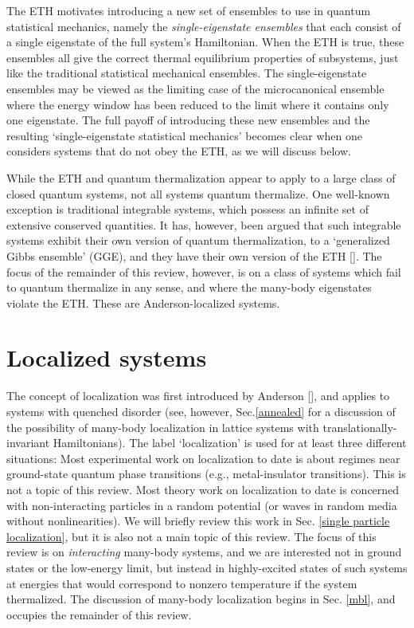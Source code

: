 \documentclass[amsmath,onecolumn, superscriptaddress,preprint,aps]{revtex4}
\renewcommand{\cite}[1]{[\onlinecite{#1}]}
\begin{document}
The ETH motivates introducing a new set of ensembles to use in quantum statistical mechanics, namely the {\it single-eigenstate ensembles} that each consist of a single eigenstate of the full system's Hamiltonian.  When the ETH is true, these ensembles all give the correct thermal equilibrium properties of subsystems, just like the traditional statistical mechanical ensembles.  The single-eigenstate ensembles may be viewed as the limiting case of the microcanonical ensemble where the energy window has been reduced to the limit where it contains only one eigenstate.  The full payoff of introducing these new ensembles and the resulting `single-eigenstate statistical mechanics' becomes clear when one considers systems that do not obey the ETH, as we will discuss below.

While the ETH and quantum thermalization appear to apply to a large class of closed quantum systems, not all systems quantum thermalize.  One well-known exception is traditional integrable systems, which possess an infinite set of extensive conserved quantities.  It has, however, been argued that such integrable systems exhibit their own version of quantum thermalization, to a `generalized Gibbs ensemble' (GGE), and they have their own version of the ETH \cite{GGE0, GGE1, GGE2}. The focus of the remainder of this review, however, is on a class of systems which fail to quantum thermalize in any sense, and where the many-body eigenstates violate the ETH.  These are Anderson-localized systems.

\section{Localized systems}
The concept of localization was first introduced by Anderson \cite{Anderson}, and applies to systems with quenched disorder (see, however, Sec.\ref{annealed} for a discussion of the possibility of many-body localization in lattice systems with translationally-invariant Hamiltonians).  The label `localization' is used for at least three different situations:  Most experimental work on localization to date is about regimes near ground-state quantum phase transitions (e.g., metal-insulator transitions).  This is not a topic of this review.  Most theory work on localization to date is concerned with non-interacting particles in a random potential (or waves in random media without nonlinearities).  We will briefly review this work in Sec. \ref{single particle localization}, but it is also not a main topic of this review.  The focus of this review is on {\it interacting} many-body systems, and we are interested not in ground states or the low-energy limit, but instead in highly-excited states of such systems at energies that would correspond to nonzero temperature if the system thermalized.  The discussion of many-body localization begins in Sec. \ref{mbl}, and occupies the remainder of this review.
\end{document}
